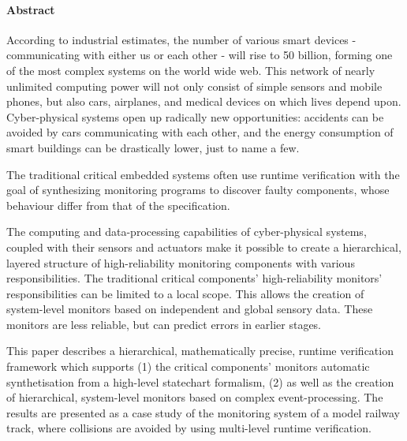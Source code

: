 \newpage

\paragraph*{Abstract}

According to industrial estimates, the number of various smart devices - communicating with either us or each other - will rise to 50 billion, forming one of the most complex systems on the world wide web. This network of nearly unlimited computing power will not only consist of simple sensors and mobile phones, but also cars, airplanes, and medical devices on which lives depend upon. Cyber-physical systems open up radically new opportunities: accidents can be avoided by cars communicating with each other, and the energy consumption of smart buildings can be drastically lower, just to name a few.

The traditional critical embedded systems often use runtime verification with the goal of synthesizing monitoring programs to discover faulty components, whose behaviour differ from that of the specification.

The computing and data-processing capabilities of cyber-physical systems, coupled with their sensors and actuators make it possible to create a hierarchical, layered structure of high-reliability monitoring components with various responsibilities. The traditional critical components' high-reliability monitors' responsibilities can be limited to a local scope. This allows the creation of system-level monitors based on independent and global sensory data. These monitors are less reliable, but can predict errors in earlier stages.

This paper describes a hierarchical, mathematically precise, runtime verification framework which supports (1) the critical components' monitors automatic synthetisation from a high-level statechart formalism, (2) as well as the creation of hierarchical, system-level monitors based on complex event-processing. The results are presented as a case study of the monitoring system of a model railway track, where collisions are avoided by using multi-level runtime verification.
